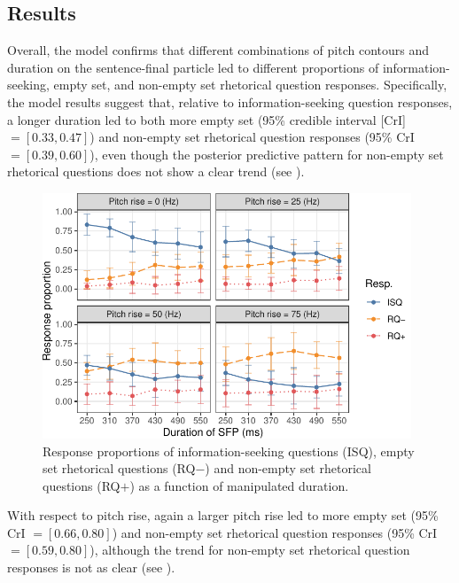\documentclass[output=paper,colorlinks,citecolor=brown            ,chinesefont]{langscibook}
\begin{document}
\subsection{Results}\label{subsubsec:results}


Overall, the model confirms that different combinations of pitch contours and duration on the sentence-final particle led to different proportions of information-seeking, empty set, and non-empty set rhetorical question responses. Specifically, the model results suggest that, relative to information-seeking question responses, a longer duration led to both more empty set (95\% credible interval [CrI] $= [0.33, 0.47]$) and non-empty set rhetorical question responses (95\% CrI $= [0.39, 0.60]$), even though the posterior predictive pattern for non-empty set rhetorical questions does not show a clear trend (see ).

\begin{figure}
    \centering
    \includegraphics[width=11cm]{figures/results_duration_no_tag.pdf}
    \caption{Response proportions of information-seeking questions (ISQ), empty set rhetorical questions (RQ$-$) and non-empty set rhetorical questions (RQ$+$) as a function of manipulated duration.}
    \label{fig:ret1}
\end{figure}

With respect to pitch rise, again a larger pitch rise led to more empty set (95\% CrI $= [0.66, 0.80]$) and non-empty set rhetorical question responses (95\% CrI $= [0.59, 0.80]$), although the trend for non-empty set rhetorical question responses is not as clear (see ).
\end{document}
